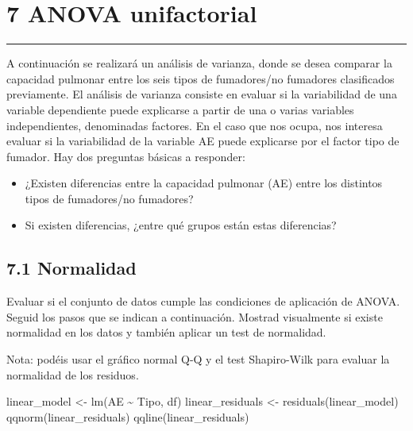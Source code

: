 \documentclass[
]{article}
\newenvironment{Shaded}{\begin{snugshade}}{\end{snugshade}}
\newcommand{\FunctionTok}[1]{\textcolor[rgb]{0.00,0.00,0.00}{#1}}
\newcommand{\NormalTok}[1]{#1}
\newcommand{\OtherTok}[1]{\textcolor[rgb]{0.56,0.35,0.01}{#1}}
\newcommand{\SpecialCharTok}[1]{\textcolor[rgb]{0.00,0.00,0.00}{#1}}
\providecommand{\tightlist}{%
  \setlength{\itemsep}{0pt}\setlength{\parskip}{0pt}}
\begin{document}
\newpage

\hypertarget{anova-unifactorial}{%
\section{7 ANOVA unifactorial}\label{anova-unifactorial}}

\begin{center}\rule{0.5\linewidth}{0.5pt}\end{center}

\vspace{0.3cm}

A continuación se realizará un análisis de varianza, donde se desea
comparar la capacidad pulmonar entre los seis tipos de fumadores/no
fumadores clasificados previamente. El análisis de varianza consiste en
evaluar si la variabilidad de una variable dependiente puede explicarse
a partir de una o varias variables independientes, denominadas factores.
En el caso que nos ocupa, nos interesa evaluar si la variabilidad de la
variable AE puede explicarse por el factor tipo de fumador. Hay dos
preguntas básicas a responder:

\begin{itemize}
\tightlist
\item
  ¿Existen diferencias entre la capacidad pulmonar (AE) entre los
  distintos tipos de fumadores/no fumadores?
\item
  Si existen diferencias, ¿entre qué grupos están estas diferencias?
\end{itemize}

\vspace{0.3cm}

\hypertarget{normalidad}{%
\subsection{7.1 Normalidad}\label{normalidad}}

Evaluar si el conjunto de datos cumple las condiciones de aplicación de
ANOVA. Seguid los pasos que se indican a continuación. Mostrad
visualmente si existe normalidad en los datos y también aplicar un test
de normalidad.

Nota: podéis usar el gráfico normal Q-Q y el test Shapiro-Wilk para
evaluar la normalidad de los residuos.

\vspace{0.3cm}

\begin{Shaded}
\begin{Highlighting}[]
\NormalTok{linear\_model }\OtherTok{\textless{}{-}} \FunctionTok{lm}\NormalTok{(AE }\SpecialCharTok{\textasciitilde{}}\NormalTok{ Tipo, df)}
\NormalTok{linear\_residuals }\OtherTok{\textless{}{-}} \FunctionTok{residuals}\NormalTok{(linear\_model)}
\FunctionTok{qqnorm}\NormalTok{(linear\_residuals)}
\FunctionTok{qqline}\NormalTok{(linear\_residuals)}
\end{Highlighting}
\end{Shaded}
\end{document}
